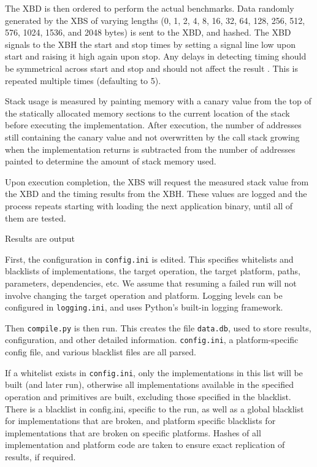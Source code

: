 \documentclass[twoside,11pt]{cergdoc}
\begin{document}
The XBD is then ordered to perform the actual benchmarks. Data randomly
generated by the XBS of varying lengths (0, 1, 2, 4, 8, 16, 32, 64, 128, 256, 512, 576, 1024,
1536, and 2048 bytes) is sent to the XBD, and hashed. The XBD signals to the XBH
the start and stop times by setting a signal line low upon start and raising it
high again upon stop. Any delays in detecting timing should be symmetrical
across start and stop and should not affect the result \cite{xbx}. This is
repeated multiple times (defaulting to 5). 

Stack usage is measured by painting memory with a canary value from the top of
the statically allocated memory sections to the current location of the stack
before executing the implementation. After execution, the number of addresses
still containing the canary value and not overwritten by the call stack growing
when the implementation returns is subtracted from the number of addresses
painted to determine the amount of stack memory used. 



Upon execution completion, the XBS will request the measured stack value from
the XBD and the timing results from the XBH. These values are logged and the
process repeats starting with loading the next application binary, until all of
them are tested. 

Results are output



First, the configuration in \texttt{config.ini} is edited. This specifies
whitelists and blacklists of implementations, the target operation, the target
platform, paths, parameters, dependencies, etc. We assume that resuming a failed
run will not involve changing the target operation and platform. Logging levels
can be configured in \texttt{logging.ini}, and uses Python's built-in logging
framework. 

Then \texttt{compile.py} is then run. This creates the file \texttt{data.db},
used to store results, configuration, and other detailed
information. \texttt{config.ini}, a platform-specific config file, and various
blacklist files are all parsed. 

If a whitelist exists in \texttt{config.ini}, only the
implementations in this list will be built (and later run), otherwise all
implementations available in the specified operation and primitives are built,
excluding those specified in the blacklist. There is a blacklist in config.ini,
specific to the run, as well as a global blacklist for implementations that are
broken, and platform specific blacklists for implementations that are broken on
specific platforms. Hashes of all implementation and platform code are taken to
ensure exact replication of results, if required.
\end{document}
